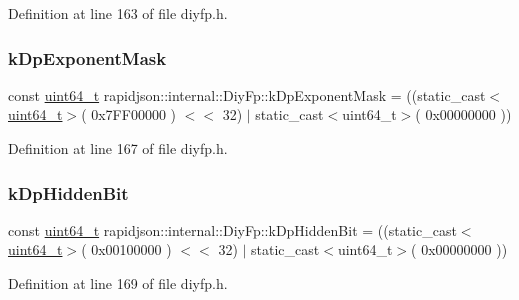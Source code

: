 Definition at line 163 of file diyfp.\+h.

\mbox{\label{structrapidjson_1_1internal_1_1_diy_fp_a9ebf259cf0143f8701ec213d1f9b0221}} 
\subsubsection{\texorpdfstring{kDpExponentMask}{kDpExponentMask}}
{\footnotesize\ttfamily const \mbox{\hyperlink{stdint_8h_aec6fcb673ff035718c238c8c9d544c47}{uint64\+\_\+t}} rapidjson\+::internal\+::\+Diy\+Fp\+::k\+Dp\+Exponent\+Mask = ((static\+\_\+cast$<$\mbox{\hyperlink{stdint_8h_aec6fcb673ff035718c238c8c9d544c47}{uint64\+\_\+t}}$>$( 0x7\+F\+F00000 ) $<$$<$ 32) $\vert$ static\+\_\+cast$<$uint64\+\_\+t$>$( 0x00000000 ))\hspace{0.3cm}{\ttfamily [static]}}



Definition at line 167 of file diyfp.\+h.

\mbox{\label{structrapidjson_1_1internal_1_1_diy_fp_a1e6bd7e15372bd4a03507e948dc2b242}} 
\subsubsection{\texorpdfstring{kDpHiddenBit}{kDpHiddenBit}}
{\footnotesize\ttfamily const \mbox{\hyperlink{stdint_8h_aec6fcb673ff035718c238c8c9d544c47}{uint64\+\_\+t}} rapidjson\+::internal\+::\+Diy\+Fp\+::k\+Dp\+Hidden\+Bit = ((static\+\_\+cast$<$\mbox{\hyperlink{stdint_8h_aec6fcb673ff035718c238c8c9d544c47}{uint64\+\_\+t}}$>$( 0x00100000 ) $<$$<$ 32) $\vert$ static\+\_\+cast$<$uint64\+\_\+t$>$( 0x00000000 ))\hspace{0.3cm}{\ttfamily [static]}}



Definition at line 169 of file diyfp.\+h.

\mbox{\label{structrapidjson_1_1internal_1_1_diy_fp_ab154a9e79d23e6670a5a4025941b4aba}} 
